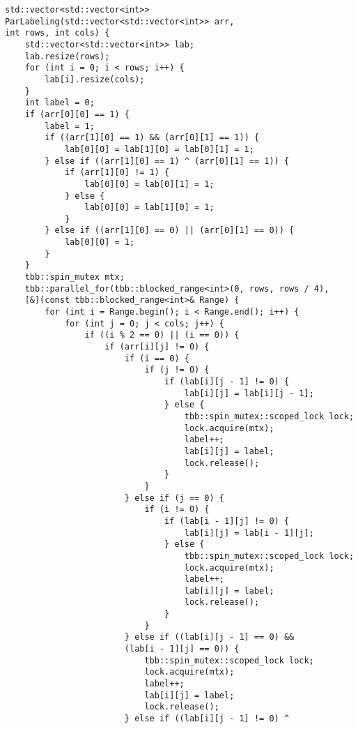 \documentclass{report}
\begin{document}
\begin{lstlisting}
std::vector<std::vector<int>> ParLabeling(std::vector<std::vector<int>> arr,
int rows, int cols) {
    std::vector<std::vector<int>> lab;
    lab.resize(rows);
    for (int i = 0; i < rows; i++) {
        lab[i].resize(cols);
    }
    int label = 0;
    if (arr[0][0] == 1) {
        label = 1;
        if ((arr[1][0] == 1) && (arr[0][1] == 1)) {
            lab[0][0] = lab[1][0] = lab[0][1] = 1;
        } else if ((arr[1][0] == 1) ^ (arr[0][1] == 1)) {
            if (arr[1][0] != 1) {
                lab[0][0] = lab[0][1] = 1;
            } else {
                lab[0][0] = lab[1][0] = 1;
            }
        } else if ((arr[1][0] == 0) || (arr[0][1] == 0)) {
            lab[0][0] = 1;
        }
    }
    tbb::spin_mutex mtx;
    tbb::parallel_for(tbb::blocked_range<int>(0, rows, rows / 4),
    [&](const tbb::blocked_range<int>& Range) {
        for (int i = Range.begin(); i < Range.end(); i++) {
            for (int j = 0; j < cols; j++) {
                if ((i % 2 == 0) || (i == 0)) {
                    if (arr[i][j] != 0) {
                        if (i == 0) {
                            if (j != 0) {
                                if (lab[i][j - 1] != 0) {
                                    lab[i][j] = lab[i][j - 1];
                                } else {
                                    tbb::spin_mutex::scoped_lock lock;
                                    lock.acquire(mtx);
                                    label++;
                                    lab[i][j] = label;
                                    lock.release();
                                }
                            }
                        } else if (j == 0) {
                            if (i != 0) {
                                if (lab[i - 1][j] != 0) {
                                    lab[i][j] = lab[i - 1][j];
                                } else {
                                    tbb::spin_mutex::scoped_lock lock;
                                    lock.acquire(mtx);
                                    label++;
                                    lab[i][j] = label;
                                    lock.release();
                                }
                            }
                        } else if ((lab[i][j - 1] == 0) &&
                        (lab[i - 1][j] == 0)) {
                            tbb::spin_mutex::scoped_lock lock;
                            lock.acquire(mtx);
                            label++;
                            lab[i][j] = label;
                            lock.release();
                        } else if ((lab[i][j - 1] != 0) ^

\end{lstlisting}
\end{document}
